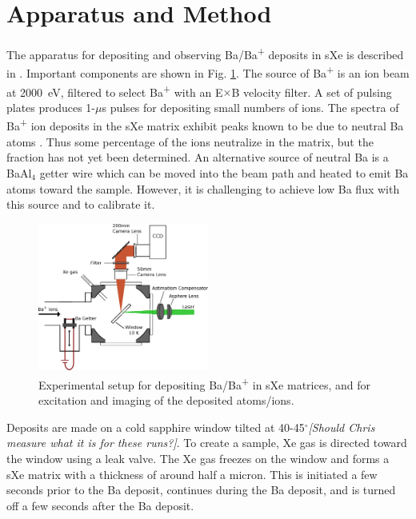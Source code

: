 \documentclass[aps,pra,reprint,superscriptaddress]{revtex4-1}
\begin{document}

\section{Apparatus and Method}
\label{sec:apparatus}

The apparatus for depositing and observing Ba/Ba\textsuperscript{+} deposits in sXe is described in \cite{Mong2015}.  Important components are shown in Fig. \ref{fig:apparatus}.  The source of Ba\textsuperscript{+} is an ion beam at 2000~eV, filtered to select Ba\textsuperscript{+} with an E$\times$B velocity filter.  A set of pulsing plates produces 1-$\mu$s pulses for depositing small numbers of ions.  The spectra of Ba\textsuperscript{+} ion deposits in the sXe matrix exhibit peaks known to be due to neutral Ba atoms \cite{Mong2015}.  Thus some percentage of the ions neutralize in the matrix, but the fraction has not yet been determined.  An alternative source of neutral Ba is a BaAl$_{4}$ getter wire which can be moved into the beam path and heated to emit Ba atoms toward the sample.  However, it is challenging to achieve low Ba flux with this source and to calibrate it.

\begin{figure}
\includegraphics[width=0.5\textwidth]{figures/cryo_inkscape_chris_full.eps}
\caption{Experimental setup for depositing Ba/Ba\textsuperscript{+} in sXe matrices, and for excitation and imaging of the deposited atoms/ions.}
\label{fig:apparatus}
\end{figure}

Deposits are made on a cold sapphire window tilted at {\color{red}40-45}$^{\circ}$\emph{\color{gray}[Should Chris measure what it is for these runs?]}.  To create a sample, Xe gas is directed toward the window using a leak valve. The Xe gas freezes on the window and forms a sXe matrix with a thickness of around half a micron.  This is initiated a few seconds prior to the Ba deposit, continues during the Ba deposit, and is turned off a few seconds after the Ba deposit.
\end{document}
